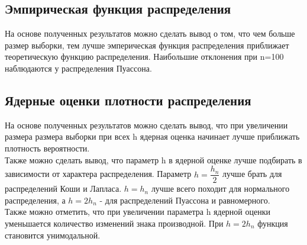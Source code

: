 \subsection{Эмпирическая функция распределения}

На основе полученных результатов можно сделать вывод о том, что чем больше размер выборки, тем лучше эмперическая функция распределения приближает теоретическую функцию распределения. Наибольшие отклонения при n=100 наблюдаются у распределения Пуассона.  

\subsection{Ядерные оценки плотности распределения}

На основе полученных результатов можно сделать вывод, что при увеличении размера размера выборки при всех h ядерная оценка начинает лучше приближать плотность вероятности. \\
Также можно сделать вывод, что параметр h в ядерной оценке лучше подбирать в зависимости от характера распределения. Параметр $ h = \dfrac{h_n}{2}$ лучше брать для распределений Коши и Лапласа. $h = h_n$ лучше всего походит для нормального распределения, а $ h = 2h_n $ - для распределений Пуассона и равномерного. \\
Также можно отметить, что при увеличении параметра h ядерной оценки уменьшается количество изменений знака производной. При $h=2h_n$ функция становится унимодальной. 